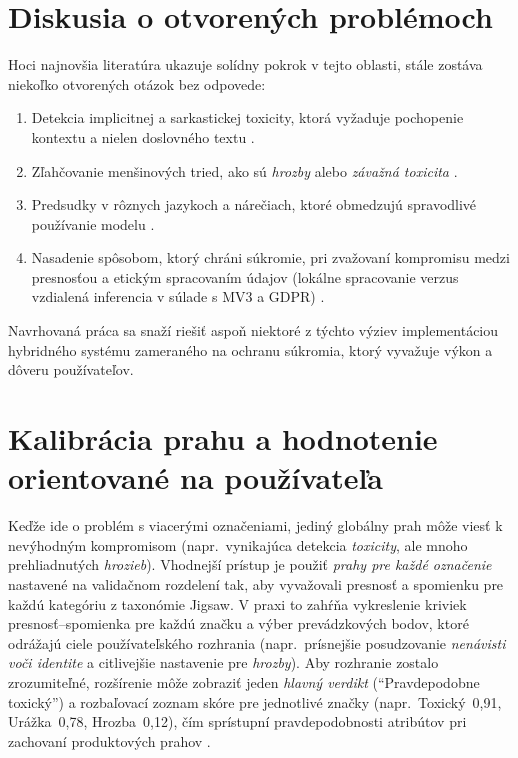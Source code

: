 \section{Diskusia o otvorených problémoch}
Hoci najnovšia literatúra ukazuje solídny pokrok v tejto oblasti, stále zostáva niekoľko otvorených otázok bez odpovede:
\begin{enumerate}
  \item Detekcia implicitnej a sarkastickej toxicity, ktorá vyžaduje pochopenie kontextu a nielen doslovného textu \cite{jigsaw2018toxic}\cite{toxigen2022}\cite{hatecheck2021}.
  \item Zľahčovanie menšinových tried, ako sú \emph{hrozby} alebo \emph{závažná toxicita} \cite{tsoumakas2007multilabel}\cite{sikiandani2025browser}.
  \item Predsudky v rôznych jazykoch a nárečiach, ktoré obmedzujú spravodlivé používanie modelu \cite{jigsaw2019bias}\cite{jigsaw2020multilingual}\cite{borkan2019nuanced}\cite{sap2019racialbias}.
  \item Nasadenie spôsobom, ktorý chráni súkromie, pri zvažovaní kompromisu medzi presnosťou a etickým spracovaním údajov (lokálne spracovanie verzus vzdialená inferencia v súlade s MV3 a GDPR) \cite{tfjsToxicity}\cite{chromemv3}\cite{edpb2019dpbdd}.
\end{enumerate}

Navrhovaná práca sa snaží riešiť aspoň niektoré z týchto výziev implementáciou hybridného systému zameraného na ochranu súkromia, ktorý vyvažuje výkon a dôveru používateľov.

\section{Kalibrácia prahu a hodnotenie orientované na používateľa}
Keďže ide o problém s viacerými označeniami, jediný globálny prah môže viesť k nevýhodným kompromisom (napr.\ vynikajúca detekcia \emph{toxicity}, ale mnoho prehliadnutých \emph{hrozieb}). Vhodnejší prístup je použiť \emph{prahy pre každé označenie} nastavené na validačnom rozdelení tak, aby vyvažovali presnosť a spomienku pre každú kategóriu z taxonómie Jigsaw. V praxi to zahŕňa vykreslenie kriviek presnosť--spomienka pre každú značku a výber prevádzkových bodov, ktoré odrážajú ciele používateľského rozhrania (napr.\ prísnejšie posudzovanie \emph{nenávisti voči identite} a citlivejšie nastavenie pre \emph{hrozby}). Aby rozhranie zostalo zrozumiteľné, rozšírenie môže zobraziť jeden \emph{hlavný verdikt} (``Pravdepodobne toxický'') a rozbaľovací zoznam skóre pre jednotlivé značky (napr.\ Toxický~0{,}91, Urážka~0{,}78, Hrozba~0{,}12), čím sprístupní pravdepodobnosti atribútov pri zachovaní produktových prahov \cite{tsoumakas2007multilabel}\cite{jigsaw2018toxic}\cite{jigsaw2019bias}\cite{jigsaw2020multilingual}\cite{kumar2024eliminating}\cite{sikiandani2025browser}\cite{sklearnPRCurve}\cite{guo2017calibration}.

